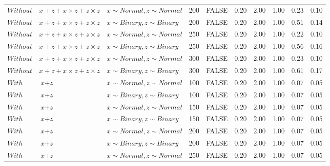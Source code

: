 \begin{longtable}{lllrlrrrrr}
  $Without$ & $\textit{x} + \textit{z} + \textit{x} \times \textit{z} + \textit{z} \times \textit{z}$ & $\textit{x} \sim Normal , \textit{z} \sim Normal$ & 200 & FALSE & 0.20 & 2.00 & 1.00 & 0.23 & 0.10 \\ 
  $Without$ & $\textit{x} + \textit{z} + \textit{x} \times \textit{z} + \textit{z} \times \textit{z}$ & $\textit{x} \sim Binary, \textit{z} \sim Binary$ & 200 & FALSE & 0.20 & 2.00 & 1.00 & 0.51 & 0.14 \\ 
  $Without$ & $\textit{x} + \textit{z} + \textit{x} \times \textit{z} + \textit{z} \times \textit{z}$ & $\textit{x} \sim Normal , \textit{z} \sim Normal$ & 250 & FALSE & 0.20 & 2.00 & 1.00 & 0.22 & 0.10 \\ 
  $Without$ & $\textit{x} + \textit{z} + \textit{x} \times \textit{z} + \textit{z} \times \textit{z}$ & $\textit{x} \sim Binary, \textit{z} \sim Binary$ & 250 & FALSE & 0.20 & 2.00 & 1.00 & 0.56 & 0.16 \\ 
  $Without$ & $\textit{x} + \textit{z} + \textit{x} \times \textit{z} + \textit{z} \times \textit{z}$ & $\textit{x} \sim Normal , \textit{z} \sim Normal$ & 300 & FALSE & 0.20 & 2.00 & 1.00 & 0.23 & 0.10 \\ 
  $Without$ & $\textit{x} + \textit{z} + \textit{x} \times \textit{z} + \textit{z} \times \textit{z}$ & $\textit{x} \sim Binary, \textit{z} \sim Binary$ & 300 & FALSE & 0.20 & 2.00 & 1.00 & 0.61 & 0.17 \\ 
  $With$ & $\textit{x} + \textit{z}$ & $\textit{x} \sim Normal , \textit{z} \sim Normal$ & 100 & FALSE & 0.20 & 2.00 & 1.00 & 0.07 & 0.05 \\ 
  $With$ & $\textit{x} + \textit{z}$ & $\textit{x} \sim Binary, \textit{z} \sim Binary$ & 100 & FALSE & 0.20 & 2.00 & 1.00 & 0.07 & 0.05 \\ 
  $With$ & $\textit{x} + \textit{z}$ & $\textit{x} \sim Normal , \textit{z} \sim Normal$ & 150 & FALSE & 0.20 & 2.00 & 1.00 & 0.07 & 0.05 \\ 
  $With$ & $\textit{x} + \textit{z}$ & $\textit{x} \sim Binary, \textit{z} \sim Binary$ & 150 & FALSE & 0.20 & 2.00 & 1.00 & 0.07 & 0.05 \\ 
  $With$ & $\textit{x} + \textit{z}$ & $\textit{x} \sim Normal , \textit{z} \sim Normal$ & 200 & FALSE & 0.20 & 2.00 & 1.00 & 0.07 & 0.05 \\ 
  $With$ & $\textit{x} + \textit{z}$ & $\textit{x} \sim Binary, \textit{z} \sim Binary$ & 200 & FALSE & 0.20 & 2.00 & 1.00 & 0.07 & 0.05 \\ 
  $With$ & $\textit{x} + \textit{z}$ & $\textit{x} \sim Normal , \textit{z} \sim Normal$ & 250 & FALSE & 0.20 & 2.00 & 1.00 & 0.07 & 0.05 \\ 

\end{longtable}
